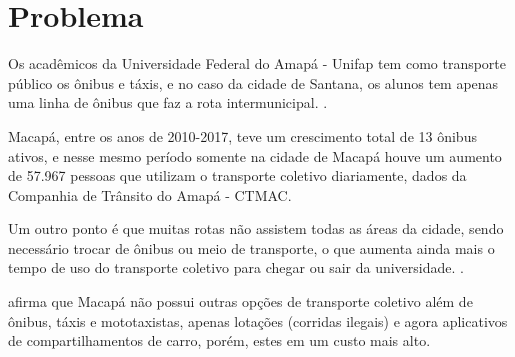 % 


\section {Problema}
\begin{comment}
	Na cidade de Macapá e Santana, as duas maiores cidade do Amapá, o número de transporte coletivo é baixo,
	existe apenas duas rodovias que interligam as cidades, 
	se locomover se torna difícil \cite{sau2018}. %
	
	Com tantos problemas aparentes causadas pelo grande inchaço populacional que  vive nas áreas urbanas, cerca de 80\% da população das duas cidades reside em áreas urbanas e sofre com a insuficiência do sistema de transporte público oferecido \cite{tostes}.
\end{comment}

Os acadêmicos da Universidade Federal do Amapá - Unifap tem como transporte público os ônibus e táxis, e no caso da cidade de Santana, os alunos tem apenas uma linha de ônibus que faz a rota intermunicipal. \cite{sau2018}.

Macapá, entre os  anos de 2010-2017, teve um crescimento total de 13 ônibus ativos, e nesse mesmo período somente na cidade de Macapá houve um aumento de 57.967 pessoas que utilizam o transporte coletivo diariamente, dados da Companhia de Trânsito do Amapá - CTMAC. 
 
Um outro ponto é que muitas rotas não assistem todas as áreas da cidade, sendo necessário trocar de ônibus ou meio de transporte, o que aumenta ainda mais o tempo de uso do transporte coletivo para chegar ou sair da universidade. \cite{galiano}.

 afirma que Macapá não possui outras opções de transporte coletivo além de ônibus, táxis e mototaxistas, apenas lotações (corridas ilegais) e agora aplicativos de compartilhamentos de carro, porém, estes em um custo mais alto.



